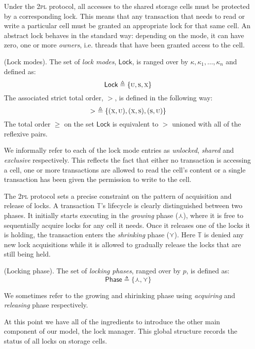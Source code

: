 Under the \textsc{2pl} protocol, all accesses to the shared storage cells must be protected by a corresponding lock. This means that any transaction that needs to read or write a particular cell must be granted an appropriate lock for that same cell. An abstract lock behaves in the standard way: depending on the mode, it can have zero, one or more \textit{owners}, i.e. threads that have been granted access to the cell.

\begin{defn}
	(Lock modes).
	The set of \emph{lock modes}, $\mathsf{Lock}$, is ranged over by $\kappa, \kappa_1, \ldots, \kappa_n$ and defined as:
	\[
		\mathsf{Lock} \triangleq \{ \textsc{u}, \textsc{s}, \textsc{x} \}
	\]
	The associated strict total order, $>$, is defined in the following way:
	\[
		>\ \triangleq \{ (\textsc{x}, \textsc{u}), (\textsc{x}, \textsc{s}), (\textsc{s}, \textsc{u}) \}
	\]
	The total order $\geq$ on the set $\mathsf{Lock}$ is equivalent to $>$ unioned with all of the reflexive pairs.
\end{defn}
We informally refer to each of the lock mode entries as \textit{unlocked}, \textit{shared} and \textit{exclusive} respectively. This reflects the fact that either no transaction is accessing a cell, one or more transactions are allowed to read the cell's content or a single transaction has been given the permission to write to the cell.

The \textsc{2pl} protocol sets a precise constraint on the pattern of acquisition and release of locks. A transaction $\mathds{T}$'s lifecycle is clearly distinguished between two phases. It initially starts executing in the \textit{growing} phase ($\curlywedge$), where it is free to sequentially acquire locks  for any cell it needs. Once it releases one of the locks it is holding, the transaction enters the \textit{shrinking} phase ($\curlyvee$). Here $\mathds{T}$ is denied any new lock acquisitions while it is allowed to gradually release the locks that are still being held.
\begin{defn}
	(Locking phase).
	 The set of \emph{locking phases}, ranged over by $p$, is defined as:
	 \[
	 	\mathsf{Phase} \triangleq \{ \curlywedge, \curlyvee \}
	 \]
\end{defn}
We sometimes refer to the growing and shirinking phase using \textit{acquiring} and \textit{releasing} phase respectively.

At this point we have all of the ingredients to introduce the other main component of our model, the lock manager. This global structure records the status of all locks on storage cells.

